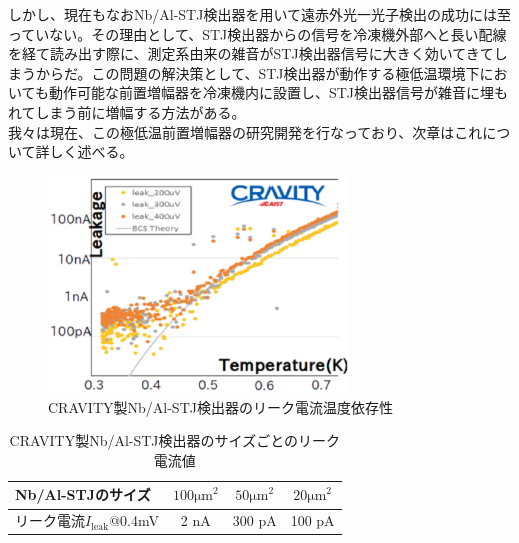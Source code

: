 		しかし、現在もなおNb/Al-STJ検出器を用いて遠赤外光一光子検出の成功には至っていない。その理由として、STJ検出器からの信号を冷凍機外部へと長い配線を経て読み出す際に、測定系由来の雑音がSTJ検出器信号に大きく効いてきてしまうからだ。この問題の解決策として、STJ検出器が動作する極低温環境下においても動作可能な前置増幅器を冷凍機内に設置し、STJ検出器信号が雑音に埋もれてしまう前に増幅する方法がある。\\
		我々は現在、この極低温前置増幅器の研究開発を行なっており、次章はこれについて詳しく述べる。
		\begin{figure}[htbp]
  			\begin{center}
  				\includegraphics[width=8.0cm]{./Chapter/Chapter2/Picture/NbAlSTJ_leaktemp.eps}
    				\caption{CRAVITY製Nb/Al-STJ検出器のリーク電流温度依存性}
	  			\label{fig:NbAlSTJ_leaktemp}
 			\end{center}
		\end{figure}
		\begin{table}[htb]
			\begin{center}
				\caption{CRAVITY製Nb/Al-STJ検出器のサイズごとのリーク電流値}
				\begin{tabular}{| l || c | c | c |} \hline
					Nb/Al-STJのサイズ & ${100 \mathrm{\mu m}}^2$ & ${50 \mathrm{\mu m}}^2$ & ${20 \mathrm{\mu m}}^2$ \\ \hline
					リーク電流$I_{\mathrm{leak}}$@0.4mV & 2 nA & 300 pA & 100 pA \\ \hline
				\end{tabular}
				\label{tab:NbAlSTJ_leaksize}
			\end{center}
		\end{table}
	